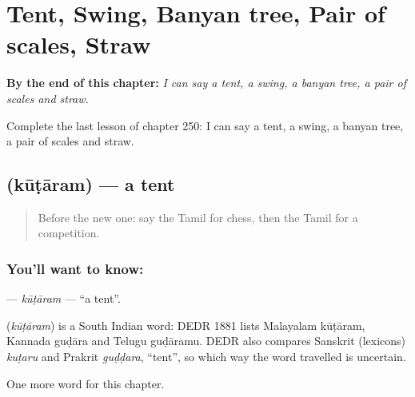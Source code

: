 
\chapter{Tent, Swing, Banyan tree, Pair of scales, Straw}
\label{ch:ta-tent-swing-banyan-tree-pair-of-scales-straw}

\begin{chapteropening}
\textbf{By the end of this chapter:} \emph{I can say a tent, a swing, a banyan tree, a pair of scales and straw.}

Complete the last lesson of chapter 250: I can say a tent, a swing, a banyan tree, a pair of scales and straw.
\end{chapteropening}

\section[\texorpdfstring{\ta{கூடாரம்} (kūṭāram)}{கூடாரம் (kūṭāram)}]{ (kūṭāram) — a tent}

\label{lesson:TA-C250-kutaram}



\begin{quote}
Before the new one: say the Tamil for chess, then the Tamil for a competition.
\end{quote}

\subsection*{You'll want to know: }
\textbf{} — \emph{kūṭāram} — \textquotedblleft{}a tent\textquotedblright{}.

\begin{cousinweb}
\textbf{} (\emph{kūṭāram}) is a South Indian word: DEDR 1881 lists Malayalam kūṭāram, Kannada guḍāra and Telugu guḍāramu. DEDR also compares Sanskrit (lexicons) \emph{kuṭaru} and Prakrit \emph{guḍḍara}, \textquotedblleft{}tent\textquotedblright{}, so which way the word travelled is uncertain.
\end{cousinweb}

\begin{grammarlens}[title={What you've built}]
One more word for this chapter.
\end{grammarlens}

